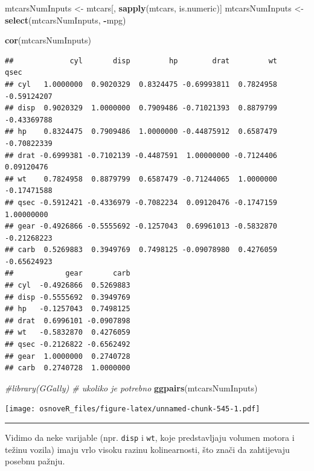 \documentclass[]{book}
\newenvironment{Shaded}{\begin{snugshade}}{\end{snugshade}}
\newcommand{\KeywordTok}[1]{\textcolor[rgb]{0.13,0.29,0.53}{\textbf{#1}}}
\newcommand{\StringTok}[1]{\textcolor[rgb]{0.31,0.60,0.02}{#1}}
\newcommand{\CommentTok}[1]{\textcolor[rgb]{0.56,0.35,0.01}{\textit{#1}}}
\newcommand{\OperatorTok}[1]{\textcolor[rgb]{0.81,0.36,0.00}{\textbf{#1}}}
\newcommand{\NormalTok}[1]{#1}
\theoremstyle{definition}
\theoremstyle{definition}
\theoremstyle{definition}
\theoremstyle{remark}
\begin{document}
\begin{Shaded}
\begin{Highlighting}[]
\NormalTok{mtcarsNumInputs <-}\StringTok{ }\NormalTok{mtcars[, }\KeywordTok{sapply}\NormalTok{(mtcars, is.numeric)]}
\NormalTok{mtcarsNumInputs <-}\StringTok{ }\KeywordTok{select}\NormalTok{(mtcarsNumInputs, }\OperatorTok{-}\NormalTok{mpg)}

\KeywordTok{cor}\NormalTok{(mtcarsNumInputs)}
\end{Highlighting}
\end{Shaded}

\begin{verbatim}
##             cyl       disp         hp        drat         wt        qsec
## cyl   1.0000000  0.9020329  0.8324475 -0.69993811  0.7824958 -0.59124207
## disp  0.9020329  1.0000000  0.7909486 -0.71021393  0.8879799 -0.43369788
## hp    0.8324475  0.7909486  1.0000000 -0.44875912  0.6587479 -0.70822339
## drat -0.6999381 -0.7102139 -0.4487591  1.00000000 -0.7124406  0.09120476
## wt    0.7824958  0.8879799  0.6587479 -0.71244065  1.0000000 -0.17471588
## qsec -0.5912421 -0.4336979 -0.7082234  0.09120476 -0.1747159  1.00000000
## gear -0.4926866 -0.5555692 -0.1257043  0.69961013 -0.5832870 -0.21268223
## carb  0.5269883  0.3949769  0.7498125 -0.09078980  0.4276059 -0.65624923
##            gear       carb
## cyl  -0.4926866  0.5269883
## disp -0.5555692  0.3949769
## hp   -0.1257043  0.7498125
## drat  0.6996101 -0.0907898
## wt   -0.5832870  0.4276059
## qsec -0.2126822 -0.6562492
## gear  1.0000000  0.2740728
## carb  0.2740728  1.0000000
\end{verbatim}

\begin{Shaded}
\begin{Highlighting}[]
\CommentTok{#library(GGally) # ukoliko je potrebno}
\KeywordTok{ggpairs}\NormalTok{(mtcarsNumInputs)}
\end{Highlighting}
\end{Shaded}

\texttt{[image: osnoveR\_files/figure-latex/unnamed-chunk-545-1.pdf]}

\begin{center}\rule{0.5\linewidth}{\linethickness}\end{center}

Vidimo da neke varijable (npr. \texttt{disp} i \texttt{wt}, koje
predstavljaju volumen motora i težinu vozila) imaju vrlo visoku razinu
kolinearnosti, što znači da zahtijevaju posebnu pažnju.
\end{document}
